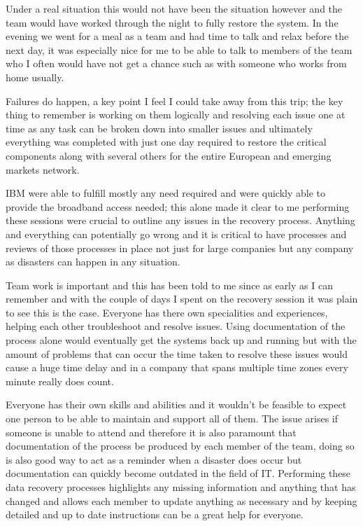Under a real situation this would not have been the situation however
and the team would have worked through the night to fully restore the
system. In the evening we went for a meal as a team and had time to talk
and relax before the next day, it was especially nice for me to be able
to talk to members of the team who I often would have not get a chance
such as with someone who works from home usually.

Failures do happen, a key point I feel I could take away from this trip;
the key thing to remember is working on them logically and resolving
each issue one at time as any task can be broken down into smaller
issues and ultimately everything was completed with just one day
required to restore the critical components along with several others
for the entire European and emerging markets network.

IBM were able to fulfill mostly any need required and were quickly able
to provide the broadband access needed; this alone made it clear to me
performing these sessions were crucial to outline any issues in the
recovery process. Anything and everything can potentially go wrong and
it is critical to have processes and reviews of those processes in place
not just for large companies but any company as disasters can happen in
any situation.

Team work is important and this has been told to me since as early as I
can remember and with the couple of days I spent on the recovery session
it was plain to see this is the case. Everyone has there own
specialities and experiences, helping each other troubleshoot and
resolve issues. Using documentation of the process alone would
eventually get the systems back up and running but with the amount of
problems that can occur the time taken to resolve these issues would
cause a huge time delay and in a company that spans multiple time zones
every minute really does count.

Everyone has their own skills and abilities and it wouldn't be feasible
to expect one person to be able to maintain and support all of them. The
issue arises if someone is unable to attend and therefore it is also
paramount that documentation of the process be produced by each member
of the team, doing so is also good way to act as a reminder when a
disaster does occur but documentation can quickly become outdated in the
field of IT. Performing these data recovery processes highlights any
missing information and anything that has changed and allows each member
to update anything as necessary and by keeping detailed and up to date
instructions can be a great help for everyone.

